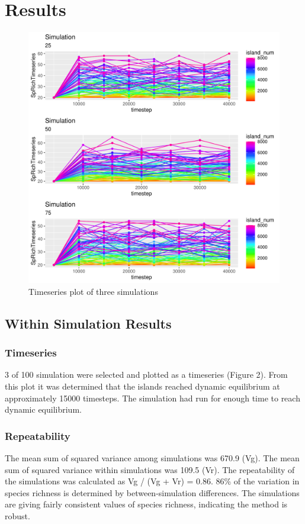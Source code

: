 \documentclass{article}
\begin{document}
\section{Results}

\begin{figure}[!h]
\centering
  \includegraphics[scale=0.5]{../../../Results/Simulation2/TimeseriesPlot.pdf}
  \caption{Timeseries plot of three simulations}
  \label{fig:Timeseries plot}
\end{figure}

\subsection{Within Simulation Results}

\subsubsection{Timeseries}
3 of 100 simulation were selected and plotted as a timeseries (Figure 2). From this plot it was determined that the islands reached dynamic equilibrium at approximately 15000 timesteps. The simulation had run for enough time to reach dynamic equilibrium.

\subsubsection{Repeatability} %
The mean sum of squared variance among simulations was 670.9 (Vg). The mean sum of squared variance within simulations was 109.5 (Vr). The repeatability of the simulations was calculated as Vg / (Vg + Vr)  = 0.86. 86\% of the variation in species richness is determined by between-simulation differences. The simulations are giving fairly consistent values of species richness, indicating the method is robust. 
\end{document}
